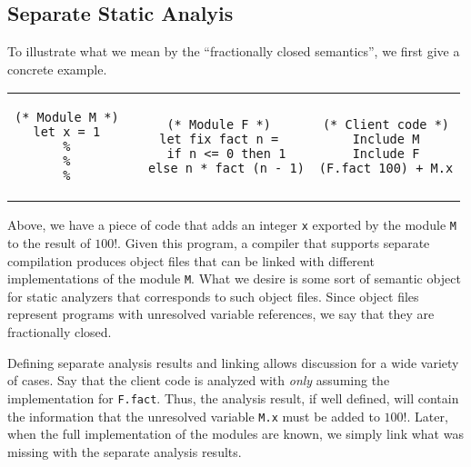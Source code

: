 \documentclass[acmsmall,screen,review]{acmart}\settopmatter{printfolios=true,printccs=false,printacmref=false}
\theoremstyle{acmdefinition}
\begin{document}
\subsection{Separate Static Analyis}
To illustrate what we mean by the ``fractionally closed semantics'', we first give a concrete example.
\begin{center}
  \begin{tabular}{ccc}
    \begin{minipage}{0.3\linewidth}
      \begin{lstlisting}[language=Coq]
(* Module M *)
let x = 1
%
%
%
    \end{lstlisting}
    \end{minipage} &
    \begin{minipage}{0.3\linewidth}
      \begin{lstlisting}[language=Coq]
(* Module F *)
let fix fact n =
  if n <= 0 then 1
  else n * fact (n - 1)
    \end{lstlisting}
    \end{minipage}      &
    \begin{minipage}{0.3\linewidth}
      \begin{lstlisting}[language=Coq]
(* Client code *)
Include M
Include F
(F.fact 100) + M.x
    \end{lstlisting}
    \end{minipage}
  \end{tabular}
\end{center}

Above, we have a piece of code that adds an integer \texttt{x} exported by the module \texttt{M} to the result of $100!$.
Given this program, a compiler that supports separate compilation produces object files that can be linked with different implementations of the module \texttt{M}.
What we desire is some sort of semantic object for static analyzers that corresponds to such object files.
Since object files represent programs with unresolved variable references, we say that they are fractionally closed.

Defining separate analysis results and linking allows discussion for a wide variety of cases.
Say that the client code is analyzed with \emph{only} assuming the implementation for \texttt{F.fact}.
Thus, the analysis result, if well defined, will contain the information that the unresolved variable \texttt{M.x} must be added to $100!$.
Later, when the full implementation of the modules are known, we simply link what was missing with the separate analysis results.
\end{document}
